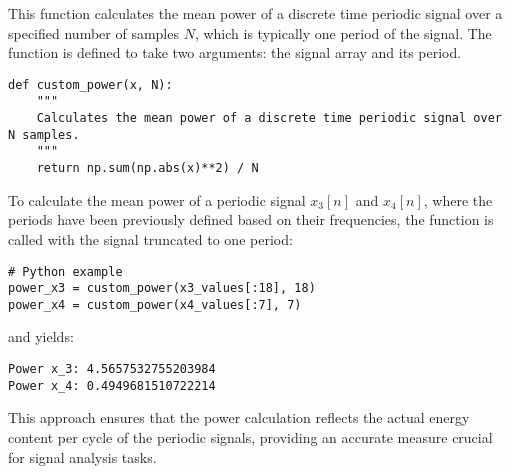 
\item[(d)]
This function calculates the mean power of a discrete time periodic signal over a specified number of samples $N$,
which is typically one period of the signal.
The function is defined to take two arguments: the signal array and its period.

\begin{verbatim}
def custom_power(x, N):
    """
    Calculates the mean power of a discrete time periodic signal over N samples.
    """
    return np.sum(np.abs(x)**2) / N
\end{verbatim}

To calculate the mean power of a periodic signal \(x_3[n]\) and \(x_4[n]\),
where the periods have been previously defined based on their frequencies,
the function is called with the signal truncated to one period:

\begin{verbatim}
# Python example
power_x3 = custom_power(x3_values[:18], 18)
power_x4 = custom_power(x4_values[:7], 7)
\end{verbatim}

and yields:

\begin{verbatim}
Power x_3: 4.5657532755203984
Power x_4: 0.4949681510722214
\end{verbatim}

This approach ensures that the power calculation reflects the actual energy content per cycle of the periodic signals,
providing an accurate measure crucial for signal analysis tasks.
